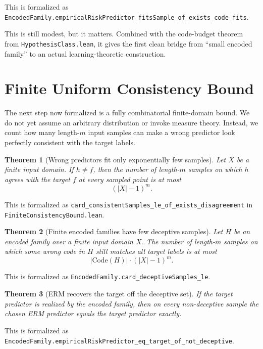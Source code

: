 \documentclass[11pt]{article}
\newtheorem{theorem}{Theorem}[section]
\theoremstyle{remark}
\begin{document}
\noindent
This is formalized as
\texttt{EncodedFamily.empiricalRiskPredictor\_fitsSample\_of\_exists\_code\_fits}.

This is still modest, but it matters.  Combined with the code-budget theorem
from \texttt{HypothesisClass.lean}, it gives the first clean bridge from
``small encoded family'' to an actual learning-theoretic construction.

\section{Finite Uniform Consistency Bound}

The next step now formalized is a fully combinatorial finite-domain bound.  We
do not yet assume an arbitrary distribution or invoke measure theory.  Instead,
we count how many length-\(m\) input samples can make a wrong predictor look
perfectly consistent with the target labels.

\begin{theorem}[Wrong predictors fit only exponentially few samples]
Let \(X\) be a finite input domain.  If \(h \neq f\), then the number of
length-\(m\) samples on which \(h\) agrees with the target \(f\) at every sampled
point is at most
\[
  (|X|-1)^m.
\]
\end{theorem}

\noindent
This is formalized as
\texttt{card\_consistentSamples\_le\_of\_exists\_disagreement} in
\texttt{FiniteConsistencyBound.lean}.

\begin{theorem}[Finite encoded families have few deceptive samples]
Let \(H\) be an encoded family over a finite input domain \(X\).  The number of
length-\(m\) samples on which some wrong code in \(H\) still matches all target
labels is at most
\[
  |\mathrm{Code}(H)| \cdot (|X|-1)^m.
\]
\end{theorem}

\noindent
This is formalized as
\texttt{EncodedFamily.card\_deceptiveSamples\_le}.

\begin{theorem}[ERM recovers the target off the deceptive set]
If the target predictor is realized by the encoded family, then on every
non-deceptive sample the chosen ERM predictor equals the target predictor
exactly.
\end{theorem}

\noindent
This is formalized as
\texttt{EncodedFamily.empiricalRiskPredictor\_eq\_target\_of\_not\_deceptive}.
\end{document}

